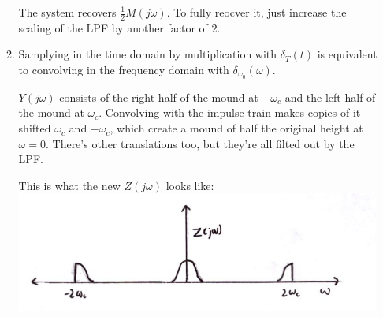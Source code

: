 \documentclass[12pt]{article}
\begin{document}
\begin{enumerate}
\begin{enumerate}
                        The system recovers $\frac{1}{2}M(j\omega)$.
                        To fully reocver it, just increase the scaling
                        of the LPF by another factor of $2$.
                  \item Samplying in the time domain by multiplication with $\delta_T(t)$
                        is equivalent to convolving in the frequency domain with $\delta_{\omega_0}(\omega)$.

                        $Y(j\omega)$ consists of the right half of the mound at $-\omega_c$
                        and the left half of the mound at $\omega_c$.
                        Convolving with the impulse train makes copies of it
                        shifted $\omega_c$ and $-\omega_c$, which create a mound
                        of half the original height at $\omega=0$.
                        There's other translations too, but they're all filted
                        out by the LPF.

                        This is what the new $Z(j\omega)$ looks like: \\
                        \includegraphics[width=12cm]{img/hw6/z}
            \end{enumerate}
\end{enumerate}
\end{document}
